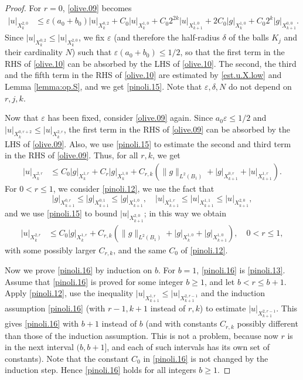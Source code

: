 \documentclass[10pt,reqno,a4paper]{article}
\numberwithin{equation}{section}
\theoremstyle{plain}
\theoremstyle{definition}
\newcommand{\e}{\varepsilon}
\begin{document}
\begin{proof}
For $r=0$, \eqref{olive.09} becomes
\begin{align}
|u|_{X^{2,0}_k}
& \leq \e (a_0 + b_0) |u|_{X^{0,2}_k}
+ C_0 |u|_{X^{1,0}_k}
+ C_0 2^{2k} |u|_{X^{1,0}_{k+1}}
+ 2 C_0 |g|_{X^{1,0}_k}
+ C_0 2^k |g|_{X^{0,0}_{k+1}}.
\label{olive.10}
\end{align}
Since $|u|_{X^{0,2}_k} \leq |u|_{X^{2,0}_k}$, 
we fix $\e$ (and therefore the half-radius $\delta$ of the balls $K_j$ 
and their cardinality $N$) 
such that $\e (a_0 + b_0) \leq 1/2$,
so that the first term in the RHS of \eqref{olive.10} can be absorbed 
by the LHS of \eqref{olive.10}. 
The second, the third and the fifth term in the RHS of \eqref{olive.10} are estimated 
by \eqref{est.u.X.low} and Lemma \ref{lemma:op.S}, and we get \eqref{pinoli.15}. 
Note that $\e, \delta, N$ do not depend on $r,j,k$. 

Now that $\e$ has been fixed, consider \eqref{olive.09} again. 
Since $a_0 \e \leq 1/2$ and $|u|_{X^{0,r+2}_k} \leq |u|_{X^{2,r}_k}$, 
the first term in the RHS of \eqref{olive.09} can be absorbed by the LHS of \eqref{olive.09}.  
Also, we use \eqref{pinoli.15} to estimate the second and third term in the RHS of \eqref{olive.09}. 
Thus, for all $r,k$, we get
\begin{align}
|u|_{X^{2,r}_k}
& \leq 
C_0 |g|_{X^{1,r}_k} + C_r |g|_{X^{1,0}_k} 
+ C_{r,k} (\| g \|_{L^2(B_1)} + |g|_{X^{0,r}_{k+1}} + |u|_{X^{1,r}_{k+1}} ).
\label{pinoli.12}
\end{align}
For $0 < r \leq 1$, we consider \eqref{pinoli.12}, 
we use the fact that 
\[
|g|_{X^{0,r}_{k+1}} \leq 
|g|_{X^{0,1}_{k+1}} \leq 
|g|_{X^{1,0}_{k+1}}, 
\quad 
|u|_{X^{1,r}_{k+1}} 
\leq |u|_{X^{1,1}_{k+1}}
\leq |u|_{X^{2,0}_{k+1}},
\]
and we use \eqref{pinoli.15} to bound $|u|_{X^{2,0}_{k+1}}$; 
in this way we obtain 
\begin{align}
|u|_{X^{2,r}_k} 
& \leq 
C_0 |g|_{X^{1,r}_k}
+ C_{r,k} (\| g \|_{L^2(B_1)} + |g|_{X^{1,0}_k} + |g|_{X^{1,0}_{k+1}}), 
\quad 0 < r \leq 1,
\label{pinoli.13}
\end{align}
with some possibly larger $C_{r,k}$, and the same $C_0$ of \eqref{pinoli.12}. 

Now we prove \eqref{pinoli.16} by induction on $b$. 
For $b=1$, \eqref{pinoli.16} is \eqref{pinoli.13}. 
Assume that \eqref{pinoli.16} is proved for some integer $b \geq 1$, 
and let $b < r \leq b+1$. 
Apply \eqref{pinoli.12}, 
use the inequality $|u|_{X^{1,r}_{k+1}} \leq |u|_{X^{2,r-1}_{k+1}}$
and the induction assumption \eqref{pinoli.16} (with $r-1, k+1$ instead of $r,k$)
to estimate $|u|_{X^{2,r-1}_{k+1}}$. This gives \eqref{pinoli.16} with $b+1$ instead of $b$ 
(and with constants $C_{r,k}$ possibly different than those of the induction assumption. 
This is not a problem, because now $r$ is in the next interval $(b, b+1]$, 
and each of such intervals has its own set of constants). 
Note that the constant $C_0$ in \eqref{pinoli.16} is not changed by the induction step. 
Hence \eqref{pinoli.16} holds for all integers $b \geq 1$. 
\end{proof}
\end{document}
